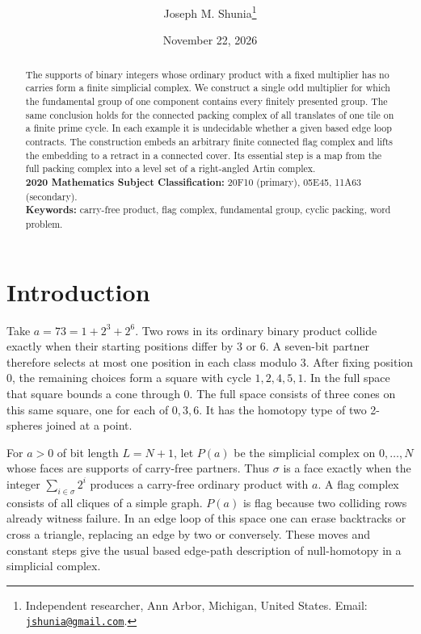 \documentclass[11pt,letterpaper]{article}
\title{\vspace{-1.5\baselineskip}%
  \manuscripttitle}
\author{Joseph M. Shunia\thanks{Independent researcher, Ann Arbor, Michigan, United States.
  Email: \href{mailto:jshunia@gmail.com}{\texttt{jshunia@gmail.com}}.}}
\date{November 22, 2026}
\newcommand{\manuscriptkeywords}{carry-free product, flag complex, fundamental group, cyclic packing, word problem}
\numberwithin{equation}{section}
\begin{document}
\maketitle
\vspace{-\baselineskip}

\begin{abstract}
The supports of binary integers whose ordinary product with a fixed multiplier has no carries
form a finite simplicial complex. We construct a single odd multiplier for which the
fundamental group of one component contains every finitely presented group. The same
conclusion holds for the connected packing complex of all translates of one tile on a finite
prime cycle. In each example it is undecidable whether a given based edge loop contracts. The
construction embeds an arbitrary finite connected flag complex and lifts the embedding to a
retract in a connected cover. Its essential step is a map from the full packing complex into a
level set of a right-angled Artin complex.
\\[2mm]
{\bf 2020 Mathematics Subject Classification:} 20F10 (primary), 05E45, 11A63 (secondary).
\\[2mm]
{\bf Keywords:} \manuscriptkeywords.
\end{abstract}

\section{Introduction}\label{sec:intro}

Take \(a=73=1+2^3+2^6\). Two rows in its ordinary binary product collide exactly when their
starting positions differ by 3 or 6. A seven-bit partner therefore selects at most one
position in each class modulo 3. After fixing position 0, the remaining choices form a square
with cycle \(1,2,4,5,1\). In the full space that square bounds a cone through 0. The full
space consists of three cones on this same square, one for each of \(0,3,6\). It has the
homotopy type of two 2-spheres joined at a point.

For \(a>0\) of bit length \(L=N+1\), let \(P(a)\) be the simplicial complex on \(0,\ldots,N\)
whose faces are supports of carry-free partners. Thus \(\sigma\) is a face exactly when the
integer \(\sum_{i\in\sigma}2^i\) produces a carry-free ordinary product with \(a\). A flag
complex consists of all cliques of a simple graph. \(P(a)\) is flag because two colliding rows
already witness failure. In an edge loop of this space one can erase backtracks or cross a
triangle, replacing an edge by two or conversely. These moves and constant steps give the
usual based edge-path description of null-homotopy in a simplicial complex.
\end{document}
